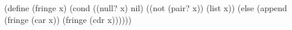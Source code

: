 \begtt\scm
(define (fringe x)
  (cond ((null? x) nil)
        ((not (pair? x)) (list x))
        (else (append (fringe (car x))
                      (fringe (cdr x))))))
\endtt

